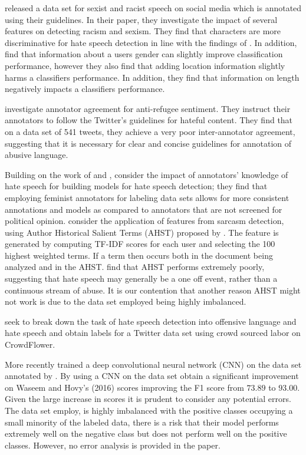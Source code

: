 \cite{Waseem-Hovy:2016} released a data set for sexist and racist speech on social media which is annotated using their guidelines. In their paper, they investigate the impact of several features on detecting racism and sexism. They find that characters are more discriminative for hate speech detection in line with the findings of \cite{Mehdad:2016}. In addition, \cite{Waseem-Hovy:2016} find that information about a users gender can slightly improve classification performance, however they also find that adding location information slightly harms a classifiers performance. In addition, they find that information on length negatively impacts a classifiers performance.

\cite{Ross:2016} investigate annotator agreement for anti-refugee sentiment. They instruct their annotators to follow the Twitter's guidelines for hateful content. They find that on a data set of 541 tweets, they achieve a very poor inter-annotator agreement, suggesting that it is necessary for clear and concise guidelines for annotation of abusive language.

Building on the work of \cite{Waseem-Hovy:2016} and \cite{Ross:2016}, \cite{Waseem:2016} consider the impact of annotators' knowledge of hate speech for building models for hate speech detection; they find that employing feminist annotators for labeling data sets allows for more consistent annotations and models as compared to annotators that are not screened for political opinion. \cite{Waseem:2016} consider the application of features from sarcasm detection, using Author Historical Salient Terms (AHST) proposed by \cite{Bamman:2015}. The feature is generated by computing TF-IDF scores for each user and selecting the 100 highest weighted terms. If a term then occurs both in the document being analyzed and in the AHST. \cite{Waseem:2016} find that AHST performs extremely poorly, suggesting that hate speech may generally be a one off event, rather than a continuous stream of abuse. It is our contention that another reason AHST might not work is due to the data set employed being highly imbalanced. 

\cite{Davidson:2017} seek to break down the task of hate speech detection into offensive language and hate speech and obtain labels for a Twitter data set using crowd sourced labor on CrowdFlower.

More recently \cite{Badjatiya:2017} trained a deep convolutional neural network (CNN) on the data set annotated by \cite{Waseem-Hovy:2016}. By using a CNN on the data set \cite{Badjatiya:2017} obtain a significant improvement on Waseem and Hovy's (2016) scores improving the F1 score from  $73.89$ to $93.00$. Given the large increase in scores it is prudent to consider any potential errors. The data set \cite{Badjatiya:2017} employ, is highly imbalanced with the positive classes occupying a small minority of the labeled data, there is a risk that their model performs extremely well on the negative class but does not perform well on the positive classes. However, no error analysis is provided in the paper.

